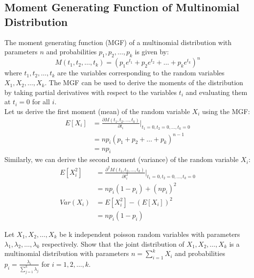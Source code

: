 \documentclass[openany]{book}
\begin{document}
\subsection{Moment Generating Function of Multinomial Distribution}
The moment generating function (MGF) of a multinomial distribution with parameters $n$ and probabilities $p_1, p_2, \ldots, p_k$ is given by:
$$M(t_1, t_2, \ldots, t_k) = \left( p_1 e^{t_1} + p_2 e^{t_2} + \ldots + p_k e^{t_k} \right)^n$$
where $t_1, t_2, \ldots, t_k$ are the variables corresponding to the random variables $X_1, X_2, \ldots, X_k$. The MGF can be used to derive the moments of the distribution by taking partial derivatives with respect to the variables $t_i$ and evaluating them at $t_i = 0$ for all $i$. \\
Let us derive the first moment (mean) of the random variable $X_i$ using the MGF:
\begin{align*}
    E[X_i] &= \frac{\partial M(t_1, t_2, \ldots, t_k)}{\partial t_i} \bigg|_{t_1=0, t_2=0, \ldots, t_k=0} \\
    &= n p_i \left( p_1 + p_2 + \ldots + p_k \right)^{n-1} \\
    &= n p_i
\end{align*}
Similarly, we can derive the second moment (variance) of the random variable $X_i$:
\begin{align*}
    E[X_i^2] &= \frac{\partial^2 M(t_1, t_2, \ldots, t_k)}{\partial t_i^2} \bigg|_{t_1=0, t_2=0, \ldots, t_k=0} \\
    &= n p_i (1 - p_i) + (n p_i)^2 \\
    Var(X_i) &= E[X_i^2] - (E[X_i])^2 \\
    &= n p_i (1 - p_i)
\end{align*}
\begin{exercise}
    Let $X_1, X_2, \ldots, X_k$ be k independent poisson random variables with parameters $\lambda_1, \lambda_2, \ldots, \lambda_k$ respectively. Show that the joint distribution of $X_1, X_2, \ldots, X_k$ is a multinomial distribution with parameters $n = \sum_{i=1}^{k} X_i$ and probabilities $p_i = \frac{\lambda_i}{\sum_{j=1}^{k} \lambda_j}$ for $i = 1, 2, \ldots, k$.
\end{exercise}
\end{document}
